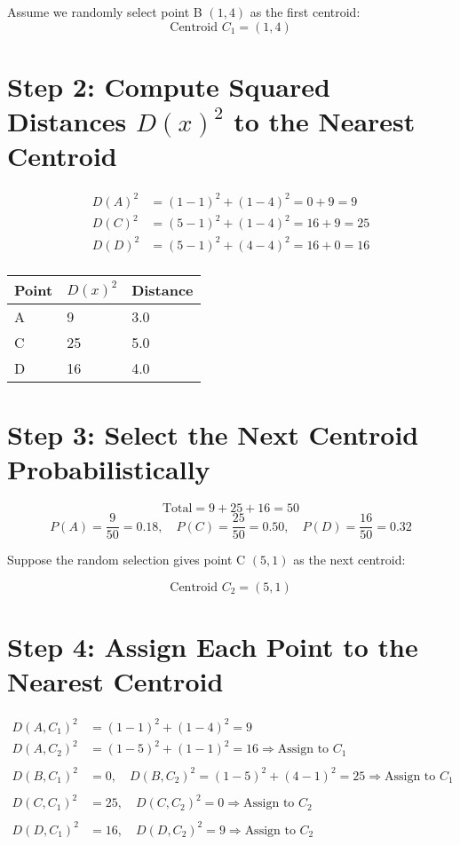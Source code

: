 \documentclass{article}
\begin{document}
Assume we randomly select point B \( (1, 4) \) as the first centroid:
\[
\text{Centroid } C_1 = (1, 4)
\]

\section*{Step 2: Compute Squared Distances \( D(x)^2 \) to the Nearest Centroid}

\[
\begin{aligned}
D(A)^2 &= (1 - 1)^2 + (1 - 4)^2 = 0 + 9 = 9 \\
D(C)^2 &= (5 - 1)^2 + (1 - 4)^2 = 16 + 9 = 25 \\
D(D)^2 &= (5 - 1)^2 + (4 - 4)^2 = 16 + 0 = 16 \\
\end{aligned}
\]

\begin{center}
\begin{tabular}{lll}
\toprule
Point & \( D(x)^2 \) & Distance \\
\midrule
A & 9 & 3.0 \\
C & 25 & 5.0 \\
D & 16 & 4.0 \\
\bottomrule
\end{tabular}
\end{center}

\section*{Step 3: Select the Next Centroid Probabilistically}

\[
\text{Total} = 9 + 25 + 16 = 50
\]
\[
P(A) = \frac{9}{50} = 0.18, \quad P(C) = \frac{25}{50} = 0.50, \quad P(D) = \frac{16}{50} = 0.32
\]

Suppose the random selection gives point C \( (5, 1) \) as the next centroid:

\[
\text{Centroid } C_2 = (5, 1)
\]

\section*{Step 4: Assign Each Point to the Nearest Centroid}

\[
\begin{aligned}
D(A, C_1)^2 &= (1 - 1)^2 + (1 - 4)^2 = 9 \\
D(A, C_2)^2 &= (1 - 5)^2 + (1 - 1)^2 = 16 \Rightarrow \text{Assign to } C_1 \\
\\
D(B, C_1)^2 &= 0, \quad D(B, C_2)^2 = (1 - 5)^2 + (4 - 1)^2 = 25 \Rightarrow \text{Assign to } C_1 \\
\\
D(C, C_1)^2 &= 25, \quad D(C, C_2)^2 = 0 \Rightarrow \text{Assign to } C_2 \\
\\
D(D, C_1)^2 &= 16, \quad D(D, C_2)^2 = 9 \Rightarrow \text{Assign to } C_2 \\
\end{aligned}
\]
\end{document}
